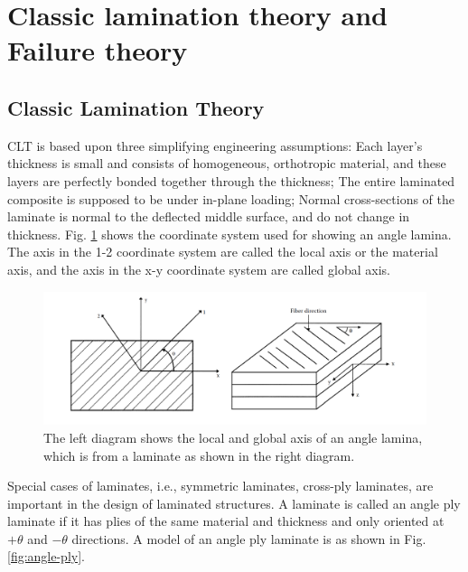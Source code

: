 \section{Classic lamination theory and Failure theory}

\subsection{Classic Lamination Theory}
CLT is based upon three simplifying engineering assumptions: Each layer’s
thickness is small and consists of homogeneous, orthotropic material, and these
layers are perfectly bonded together through the thickness; The entire
laminated composite is supposed to be under in-plane loading; Normal
cross-sections of the laminate is normal to the deflected middle surface, and
do not change in thickness. Fig. \ref{fig:lamina_local_and_global} shows the
coordinate system used for showing an angle lamina. The axis in the 1-2
coordinate system are called the local axis or the material axis, and the axis
in the x-y coordinate system are called global axis.

\begin{figure}[ht]
	\includegraphics[width=1\linewidth]{Figures/chapter5/fig/lamina_local_global_axes.png}
	\caption{The left diagram shows the local and global axis of an angle lamina, which is from a laminate as shown in the right diagram.}
	\label{fig:lamina_local_and_global}
\end{figure}

Special cases of laminates, i.e., symmetric laminates, cross-ply laminates, are
important in the design of laminated structures. A laminate is called an angle
ply laminate if it has plies of the same material and thickness and only
oriented at $+\theta$ and $-\theta$ directions. A model of an angle ply
laminate is as shown in Fig. \ref{fig:angle-ply}.  



